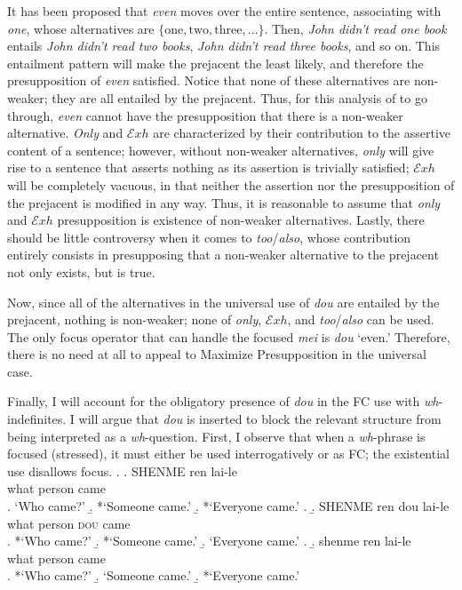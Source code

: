 \documentclass[12pt]{article}
\newcommand{\Exh}{\ensuremath{\mathcal{E}\mathit{xh}}}
\begin{document}
It has been proposed that \emph{even} moves over the entire sentence, associating with \emph{one}, whose alternatives are \(\{\text{one}, \text{two}, \text{three},\ldots\}\).
Then, \emph{John didn't read one book} entails \emph{John didn't read two books}, \emph{John didn't read three books}, and so on.
This entailment pattern will make the prejacent the least likely, and therefore the presupposition of \emph{even} satisfied.
Notice that none of these alternatives are non-weaker; they are all entailed by the prejacent.
Thus, for this analysis of \Last to go through, \emph{even} cannot have the presupposition that there is a non-weaker alternative.
\emph{Only} and {\Exh} are characterized by their contribution to the assertive content of a sentence; however, without non-weaker alternatives, \emph{only} will give rise to a sentence that asserts nothing as its assertion is trivially satisfied; {\Exh} will be completely vacuous, in that neither the assertion nor the presupposition of the prejacent is modified in any way.
Thus, it is reasonable to assume that \emph{only} and {\Exh} presupposition is existence of non-weaker alternatives.
Lastly, there should be little controversy when it comes to \emph{too}/\emph{also}, whose contribution entirely consists in presupposing that a non-weaker alternative to the prejacent not only exists, but is true.

Now, since all of the alternatives in the universal use of \emph{dou} are entailed by the prejacent, nothing is non-weaker; none of \emph{only}, {\Exh}, and \emph{too}/\emph{also} can be used.
The only focus operator that can handle the focused \emph{mei} is \emph{dou} `even.'
Therefore, there is no need at all to appeal to Maximize Presupposition in the universal case.

Finally, I will account for the obligatory presence of \emph{dou} in the FC use with \emph{wh}-indefinites.
I will argue that \emph{dou} is inserted to block the relevant structure from being interpreted as a \emph{wh}-question.
First, I observe that when a \emph{wh}-phrase is focused (stressed), it must either be used interrogatively or as FC; the existential use disallows focus.
\ex. \a. \gll 
SHENME ren lai-le \\
what person came \\
\a. `Who came?'
\b. *`Someone came.'
\b. *`Everyone came.'
\z.
\b. \gll 
SHENME ren dou lai-le \\
what person \textsc{dou} came \\
\a. *`Who came?'
\b. *`Someone came.'
\b. `Everyone came.'
\z.
\b. \gll 
shenme ren lai-le \\
what person came \\
\a. *`Who came?'
\b. `Someone came.'
\b. *`Everyone came.'
\end{document}
